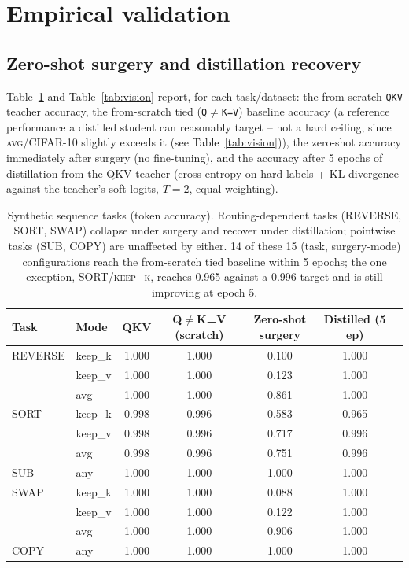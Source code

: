 \documentclass[11pt]{article}
\begin{document}
\section{Empirical validation}
\label{sec:empirical}

\subsection{Zero-shot surgery and distillation recovery}

Table~\ref{tab:synthetic} and Table~\ref{tab:vision} report, for each task/dataset:
the from-scratch \texttt{QKV} teacher accuracy, the from-scratch tied
(\texttt{Q}$\neq$\texttt{K=V}) baseline accuracy (a reference performance a distilled
student can reasonably target -- not a hard ceiling, since \textsc{avg}/CIFAR-10
slightly exceeds it (see Table~\ref{tab:vision})), the zero-shot accuracy immediately
after surgery (no fine-tuning), and the accuracy after
5 epochs of distillation from the QKV teacher (cross-entropy on hard labels + KL
divergence against the teacher's soft logits, $T=2$, equal weighting).

\begin{table}[h]
\centering
\small
\begin{tabular}{llccccc}
\toprule
Task & Mode & QKV & Q$\neq$K=V (scratch) & Zero-shot surgery & Distilled (5 ep) \\
\midrule
REVERSE & keep\_k & 1.000 & 1.000 & 0.100 & 1.000 \\
        & keep\_v & 1.000 & 1.000 & 0.123 & 1.000 \\
        & avg     & 1.000 & 1.000 & 0.861 & 1.000 \\
SORT    & keep\_k & 0.998 & 0.996 & 0.583 & 0.965 \\
        & keep\_v & 0.998 & 0.996 & 0.717 & 0.996 \\
        & avg     & 0.998 & 0.996 & 0.751 & 0.996 \\
SUB     & any     & 1.000 & 1.000 & 1.000 & 1.000 \\
SWAP    & keep\_k & 1.000 & 1.000 & 0.088 & 1.000 \\
        & keep\_v & 1.000 & 1.000 & 0.122 & 1.000 \\
        & avg     & 1.000 & 1.000 & 0.906 & 1.000 \\
COPY    & any     & 1.000 & 1.000 & 1.000 & 1.000 \\
\bottomrule
\end{tabular}
\caption{Synthetic sequence tasks (token accuracy). Routing-dependent tasks
(REVERSE, SORT, SWAP) collapse under surgery and recover under distillation;
pointwise tasks (SUB, COPY) are unaffected by either. 14 of these 15 (task,
surgery-mode) configurations reach the from-scratch tied baseline within 5 epochs; the one
exception, SORT/\textsc{keep\_k}, reaches 0.965 against a 0.996 target and is still
improving at epoch 5.}
\label{tab:synthetic}
\end{table}
\end{document}
